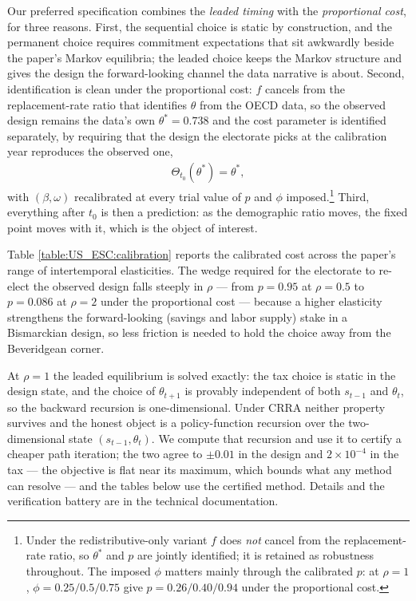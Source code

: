 Our preferred specification combines the \emph{leaded timing} with the \emph{proportional cost}, for three reasons. First, the sequential choice is static by construction, and the permanent choice requires commitment expectations that sit awkwardly beside the paper's Markov equilibria; the leaded choice keeps the Markov structure and gives the design the forward-looking channel the data narrative is about. Second, identification is clean under the proportional cost: $f$ cancels from the replacement-rate ratio that identifies $\theta$ from the OECD data, so the observed design remains the data's own $\theta^{\ast} = 0.738$ and the cost parameter is identified separately, by requiring that the design the electorate picks at the calibration year reproduces the observed one,
\begin{align}\label{eq:esc:calibration}
    \Theta_{t_0}\!\left(\theta^{\ast}\right) = \theta^{\ast},
\end{align}
with $(\beta,\omega)$ recalibrated at every trial value of $p$ and $\phi$ imposed.\footnote{Under the redistributive-only variant $f$ does \emph{not} cancel from the replacement-rate ratio, so $\theta^{\ast}$ and $p$ are jointly identified; it is retained as robustness throughout. The imposed $\phi$ matters mainly through the calibrated $p$: at $\rho = 1$, $\phi = 0.25/0.5/0.75$ give $p = 0.26/0.40/0.94$ under the proportional cost.} Third, everything after $t_0$ is then a prediction: as the demographic ratio moves, the fixed point moves with it, which is the object of interest.

Table \ref{table:US_ESC:calibration} reports the calibrated cost across the paper's range of intertemporal elasticities. The wedge required for the electorate to re-elect the observed design falls steeply in $\rho$ --- from $p = 0.95$ at $\rho = 0.5$ to $p = 0.086$ at $\rho = 2$ under the proportional cost --- because a higher elasticity strengthens the forward-looking (savings and labor supply) stake in a Bismarckian design, so less friction is needed to hold the choice away from the Beveridgean corner.



 At $\rho = 1$ the leaded equilibrium is solved exactly: the tax choice is static in the design state, and the choice of $\theta_{t+1}$ is provably independent of both $s_{t-1}$ and $\theta_t$, so the backward recursion is one-dimensional. Under CRRA neither property survives and the honest object is a policy-function recursion over the two-dimensional state $(s_{t-1},\theta_t)$. We compute that recursion and use it to certify a cheaper path iteration; the two agree to $\pm 0.01$ in the design and $2\times10^{-4}$ in the tax --- the objective is flat near its maximum, which bounds what any method can resolve --- and the tables below use the certified method. Details and the verification battery are in the technical documentation.

